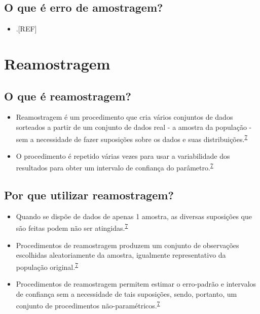 \documentclass[
  a4paper,
]{book}
\providecommand{\tightlist}{%
  \setlength{\itemsep}{0pt}\setlength{\parskip}{0pt}}
\begin{document}
\hypertarget{o-que-uxe9-erro-de-amostragem}{%
\subsection{O que é erro de amostragem?}\label{o-que-uxe9-erro-de-amostragem}}

\begin{itemize}
\tightlist
\item
  .{[}REF{]}
\end{itemize}

\hypertarget{reamostragem}{%
\section{Reamostragem}\label{reamostragem}}

\hypertarget{o-que-uxe9-reamostragem}{%
\subsection{O que é reamostragem?}\label{o-que-uxe9-reamostragem}}

\begin{itemize}
\item
  Reamostragem é um procedimento que cria vários conjuntos de dados sorteados a partir de um conjunto de dados real - a amostra da população - sem a necessidade de fazer suposições sobre os dados e suas distribuições.\textsuperscript{\protect\hyperlink{ref-Bland2015}{7}}
\item
  O procedimento é repetido várias vezes para usar a variabilidade dos resultados para obter um intervalo de confiança do parâmetro.\textsuperscript{\protect\hyperlink{ref-Bland2015}{7}}
\end{itemize}

\hypertarget{por-que-utilizar-reamostragem}{%
\subsection{Por que utilizar reamostragem?}\label{por-que-utilizar-reamostragem}}

\begin{itemize}
\item
  Quando se dispõe de dados de apenas 1 amostra, as diversas suposições que são feitas podem não ser atingidas.\textsuperscript{\protect\hyperlink{ref-Bland2015}{7}}
\item
  Procedimentos de reamostragem produzem um conjunto de observações escolhidas aleatoriamente da amostra, igualmente representativo da população original.\textsuperscript{\protect\hyperlink{ref-Bland2015}{7}}
\item
  Procedimentos de reamostragem permitem estimar o erro-padrão e intervalos de confiança sem a necessidade de tais suposições, sendo, portanto, um conjunto de procedimentos não-paramétricos.\textsuperscript{\protect\hyperlink{ref-Bland2015}{7}}
\end{itemize}
\end{document}
